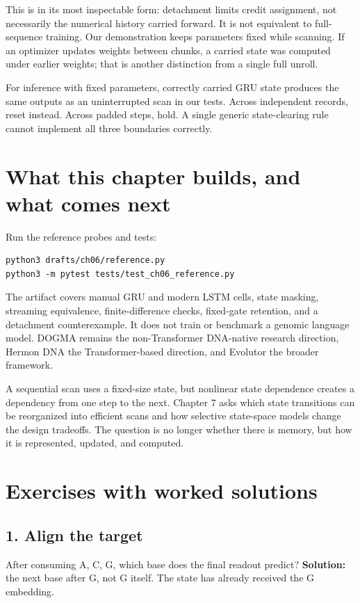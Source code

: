 \begin{center}\small\end{center}

This is  in its most inspectable form:
detachment limits credit assignment, not necessarily the numerical
history carried forward. It is not equivalent to full-sequence training.
Our demonstration keeps parameters fixed while scanning. If an optimizer
updates weights between chunks, a carried state was computed under earlier
weights; that is another distinction from a single full unroll.

For inference with fixed parameters, correctly carried GRU state produces
the same outputs as an uninterrupted scan in our tests. Across independent
records, reset instead. Across padded steps, hold. A single generic
state-clearing rule cannot implement all three boundaries correctly.

\section{What this chapter builds, and what comes next}

Run the reference probes and tests:
\begin{Verbatim}[fontsize=\small]
python3 drafts/ch06/reference.py
python3 -m pytest tests/test_ch06_reference.py
\end{Verbatim}
The artifact covers manual GRU and modern LSTM cells, state masking,
streaming equivalence, finite-difference checks, fixed-gate retention,
and a detachment counterexample. It does not train or benchmark a genomic
language model. DOGMA remains the non-Transformer DNA-native research
direction, Hermon DNA the Transformer-based direction, and Evolutor the
broader framework.

A sequential scan uses a fixed-size state, but nonlinear state dependence
creates a dependency from one step to the next. Chapter 7 asks which state
transitions can be reorganized into efficient scans and how selective
state-space models change the design tradeoffs. The question is no longer
whether there is memory, but how it is represented, updated, and computed.

\section{Exercises with worked solutions}

\subsection*{1. Align the target}
After consuming A, C, G, which base does the final readout predict?
\textbf{Solution:} the next base after G, not G itself. The state has
already received the G embedding.

